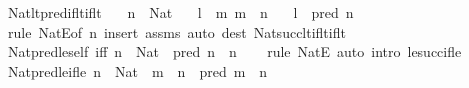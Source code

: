 \begin{isabellebody}
%
\isadelimproof
\isanewline
%
\endisadelimproof
\isanewline
{}\isamarkupfalse%
\ Nat{\isacharunderscore}{\kern0pt}lt{\isacharunderscore}{\kern0pt}pred{\isacharunderscore}{\kern0pt}if{\isacharunderscore}{\kern0pt}lt{\isacharunderscore}{\kern0pt}if{\isacharunderscore}{\kern0pt}lt{\isacharcolon}{\kern0pt}\isanewline
\ \ \ {\isachardoublequoteopen}n\ {\isacharcolon}{\kern0pt}\ Nat{\isachardoublequoteclose}\isanewline
\ \ \ {\isachardoublequoteopen}l\ {\isacharless}{\kern0pt}\ m{\isachardoublequoteclose}\ {\isachardoublequoteopen}m\ {\isacharless}{\kern0pt}\ n{\isachardoublequoteclose}\isanewline
\ \ \ {\isachardoublequoteopen}l\ {\isacharless}{\kern0pt}\ pred\ n{\isachardoublequoteclose}\isanewline
%
\isadelimproof
\ \ %
\endisadelimproof
%
\isatagproof
{}\isamarkupfalse%
\ {\isacharparenleft}{\kern0pt}rule\ NatE{\isacharbrackleft}{\kern0pt}of\ n{\isacharbrackright}{\kern0pt}{\isacharparenright}{\kern0pt}\ {\isacharparenleft}{\kern0pt}insert\ assms{\isacharcomma}{\kern0pt}\ auto\ dest{\isacharcolon}{\kern0pt}\ Nat{\isacharunderscore}{\kern0pt}succ{\isacharunderscore}{\kern0pt}lt{\isacharunderscore}{\kern0pt}if{\isacharunderscore}{\kern0pt}lt{\isacharunderscore}{\kern0pt}if{\isacharunderscore}{\kern0pt}lt{\isacharparenright}{\kern0pt}%
\endisatagproof
{\isafoldproof}%
%
\isadelimproof
%
\endisadelimproof
%
\isadelimdocument
%
\endisadelimdocument
%
\isatagdocument
%
\isamarkuptrue%
%
\endisatagdocument
{\isafolddocument}%
%
\isadelimdocument
%
\endisadelimdocument
{}\isamarkupfalse%
\ Nat{\isacharunderscore}{\kern0pt}pred{\isacharunderscore}{\kern0pt}le{\isacharunderscore}{\kern0pt}self\ {\isacharbrackleft}{\kern0pt}iff{\isacharbrackright}{\kern0pt}{\isacharcolon}{\kern0pt}\ {\isachardoublequoteopen}n\ {\isacharcolon}{\kern0pt}\ Nat\ {\isasymLongrightarrow}\ pred\ n\ {\isasymle}\ n{\isachardoublequoteclose}\isanewline
%
\isadelimproof
\ \ %
\endisadelimproof
%
\isatagproof
{}\isamarkupfalse%
\ {\isacharparenleft}{\kern0pt}rule\ NatE{\isacharparenright}{\kern0pt}\ {\isacharparenleft}{\kern0pt}auto\ intro{\isacharcolon}{\kern0pt}\ le{\isacharunderscore}{\kern0pt}succ{\isacharunderscore}{\kern0pt}if{\isacharunderscore}{\kern0pt}le{\isacharparenright}{\kern0pt}%
\endisatagproof
{\isafoldproof}%
%
\isadelimproof
\isanewline
%
\endisadelimproof
\isanewline
{}\isamarkupfalse%
\ Nat{\isacharunderscore}{\kern0pt}pred{\isacharunderscore}{\kern0pt}le{\isacharunderscore}{\kern0pt}if{\isacharunderscore}{\kern0pt}le{\isacharcolon}{\kern0pt}\ {\isachardoublequoteopen}n\ {\isacharcolon}{\kern0pt}\ Nat\ {\isasymLongrightarrow}\ m\ {\isasymle}\ n\ {\isasymLongrightarrow}\ pred\ m\ {\isasymle}\ n{\isachardoublequoteclose}\isanewline

\end{isabellebody}
